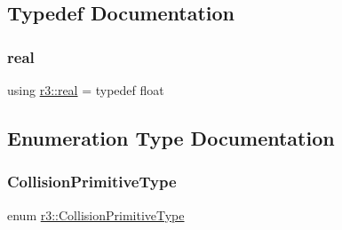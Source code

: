 \subsection{Typedef Documentation}
\mbox{\label{namespacer3_ab2016b3e3f743fb735afce242f0dc1eb}} 
\subsubsection{\texorpdfstring{real}{real}}
{\footnotesize\ttfamily using \mbox{\hyperlink{namespacer3_ab2016b3e3f743fb735afce242f0dc1eb}{r3\+::real}} = typedef float}



\subsection{Enumeration Type Documentation}
\mbox{\label{namespacer3_a7079ec5e42c1a55140d3bc093d49e319}} 
\subsubsection{\texorpdfstring{Collision\+Primitive\+Type}{CollisionPrimitiveType}}
{\footnotesize\ttfamily enum \mbox{\hyperlink{namespacer3_a7079ec5e42c1a55140d3bc093d49e319}{r3\+::\+Collision\+Primitive\+Type}}}

